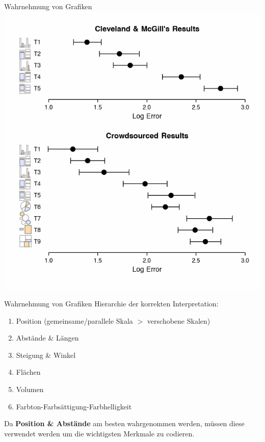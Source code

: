 \documentclass[
  10pt,
  ignorenonframetext,
]{beamer}
\providecommand{\tightlist}{%
  \setlength{\itemsep}{0pt}\setlength{\parskip}{0pt}}
\begin{document}
\begin{frame}{Wahrnehmung von Grafiken}
\label{wahrnehmung-von-grafiken-1}
\includegraphics{pics/02-clevelandgill2.png}
\end{frame}

\begin{frame}{Wahrnehmung von Grafiken}
\label{wahrnehmung-von-grafiken-2}
Hierarchie der korrekten Interpretation:

\begin{enumerate}
\tightlist
\item
  Position (gemeinsame/parallele Skala \(>\) verschobene Skalen)\\
\item
  Abstände \& Längen
\item
  Steigung \& Winkel
\item
  Flächen
\item
  Volumen
\item
  Farbton-Farbsättigung-Farbhelligkeit
\end{enumerate}

Da \textbf{Position \& Abstände} am besten wahrgenommen werden, müssen
diese verwendet werden um die wichtigsten Merkmale zu codieren.
\end{frame}
\end{document}
